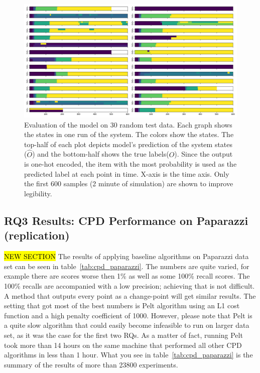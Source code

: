 \begin{figure}
    \centering
    \includegraphics[width=\linewidth]{ASE_files/test_0.png}
    \caption{Evaluation of the model on 30 random test data. Each graph shows the states in one run of the system. The colors show the states. The top-half of each plot depicts model's prediction of the system states ($\hat{O}$) and the bottom-half shows the true labels($O$). Since the output is one-hot encoded, the item with the most probability is used as the predicted label at each point in time. X-axis is the time axis. Only the first 600 samples (2 minute of simulation) are shown to improve legibility.}
    \label{fig:test_0}
\end{figure}

\subsection{RQ3 Results: CPD Performance on Paparazzi (replication)}
\hl{NEW SECTION}
The results of applying baseline algorithms on Paparazzi data set can be seen in table~\ref{tab:cpd_paparazzi}.
The numbers are quite varied, for example there are scores worse then 1\% as well as some 100\% recall scores. 
The 100\% recalls are accompanied with a low precision; achieving that is not difficult. A method that outputs every point as a change-point will get similar results. 
The setting that got most of the best numbers is Pelt algorithm using an L1 cost function and a high penalty coefficient of 1000. However, please note that Pelt is a quite slow algorithm that could easily become infeasible to run on larger data set, as it was the case for the first two RQs. 
As a matter of fact, running Pelt took more than 14 hours on the same machine that performed all other CPD algorithms in less than 1 hour. What you see in table~\ref{tab:cpd_paparazzi} is the summary of the results of more than 23800 experiments. 

